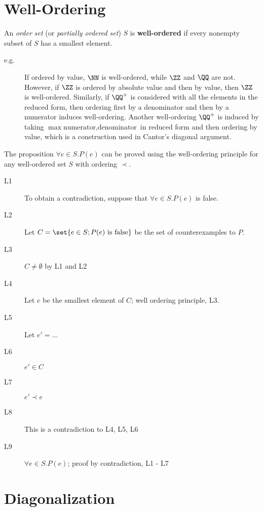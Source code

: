 \documentclass[11pt]{scrartcl}
\begin{document}
\section{Well-Ordering}

\begin{definition}
An \textit{order set} (or \textit{partially ordered set}) $S$ is \textbf{well-ordered} if every nonempty subset of $S$ has a smallest element. 
\end{definition}
\begin{description}

\item[e.g.] If ordered by value, $\NN$ is well-ordered, while $\ZZ$ and $\QQ$ are not. However, if $\ZZ$ is ordered by absolute value and then by value, then $\ZZ$ is well-ordered. Similarly, if $\QQ^+$ is considered with all the elements in the reduced form, then ordering first by a denominator and then by a numerator induces well-ordering. Another well-ordering $\QQ^+$ is induced by taking $\max{\text{numerator},\text{denominator}}$ in reduced form and then ordering by value, which is a construction used in Cantor's diagonal argument.
\end{description}

The proposition $\forall e\in S.P(e)$ can be proved using the well-ordering principle for any well-ordered set $S$ with ordering $\prec$.

\begin{description}
\item[L1] To obtain a contradiction, suppose that $\forall e\in S.P(e)$ is false.
\item[L2] Let $C = \set{e\in S; P(e) \text{ is false}}$ be the set of counterexamples to $P$.
\item[L3] $C\neq \emptyset$ by L1 and L2
\item[L4] Let $e$ be the smallest element of $C$; well ordering principle, L3.
\item[L5] Let $e' = \dots$
\item[L6] $e'\in C$
\item[L7] $e' \prec e$
\item[L8] This is a contradiction to L4, L5, L6
\item[L9] $\forall e \in S. P(e)$; proof by contradiction, L1 - L7
\end{description}

\section{Diagonalization}
\end{document}
